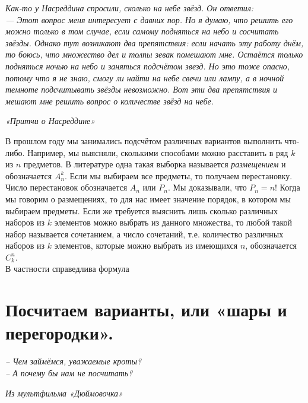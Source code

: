 
\epigraph{\textit{Как-то у Насреддина спросили, сколько на небе звёзд. Он ответил:
\\
— Этот вопрос меня интересует с давних пор. Но я думаю, что решить его можно только в том случае, если самому подняться на небо и сосчитать звёзды. Однако тут возникают два препятствия: если начать эту работу днём, то боюсь, что множество дел и толпы зевак помешают мне. Остаётся только подняться ночью на небо и заняться подсчётом звезд. Но это тоже опасно, потому что я не знаю, смогу ли найти на небе свечи или лампу, а в ночной темноте подсчитывать звёзды невозможно. Вот эти два препятствия и мешают мне решить вопрос о количестве звёзд на небе.}}{\textit{«Притчи о Насреддине»}}

В прошлом году мы занимались подсчётом различных вариантов выполнить что-либо. Например, мы выясняли, сколькими способами можно расставить в ряд $k$ из $n$ предметов. В литературе одна такая выборка называется \textit{размещением} и обозначается $A^k_n$. Если мы выбираем все предметы, то получаем перестановку. Число перестановок обозначается $A_n$ или $P_n$. Мы доказывали, что $P_n = n$! Когда мы говорим о размещениях, то для нас имеет значение порядок, в котором мы выбираем предметы. Если же требуется выяснить лишь сколько различных наборов из $k$ элементов можно выбрать из данного множества, то любой такой набор называется сочетанием, а число сочетаний, т.е. количество различных наборов из $k$ элементов, которые можно выбрать из имеющихся $n$, обозначается $C^n_k$. 
\\
В частности справедлива формула 

\section{Посчитаем варианты, или «шары и перегородки».}

\epigraph{\textit{-- Чем займёмся, уважаемые кроты?
\\
-- А почему бы нам не посчитать?}}{\textit{Из мультфильма «Дюймовочка»}}

